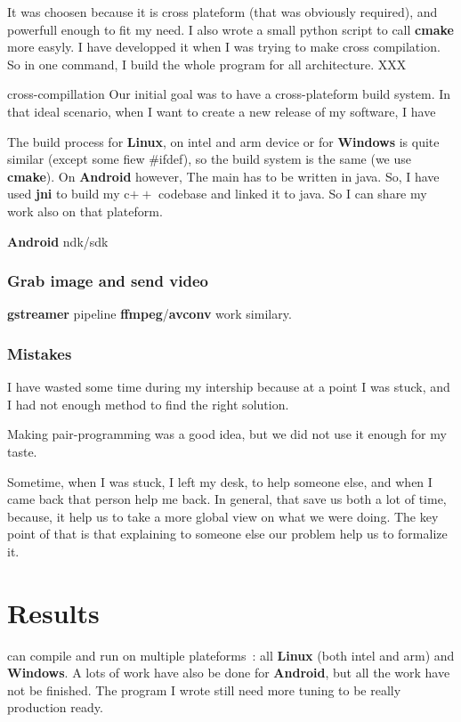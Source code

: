 \documentclass[a4paper,11pt]{custom}
\newcommand{\avconv}{\textbf{avconv}}
\newcommand{\ffmpeg}{\textbf{ffmpeg}}
\newcommand{\gstreamer}{\textbf{gstreamer}}
\newcommand{\cmake}{\textbf{cmake}}
\newcommand{\jni}{\textbf{jni}}
\newcommand{\linux}{\textbf{Linux}}
\newcommand{\win}{\textbf{Windows}}
\newcommand{\android}{\textbf{Android}}
\newcommand{\cpp}{c$++$}
\begin{document}
It was choosen because it is
cross plateform (that was obviously required), and powerfull enough to fit my
need. I also wrote a small python script to call \cmake{} more easyly. I have
developped it when I was trying to make cross compilation. So in one command, I
build the whole program for all architecture. XXX

cross-compillation
Our initial goal was to have a cross-plateform build system. In that ideal
scenario, when I want to create a new release of my software, I have

The build process for \linux, on intel and arm device or for \win{} is quite
similar (except some fiew \#ifdef), so the build system is the same (we use
\cmake). On \android{} however, The main has to be written in java. So, I have
used \jni{} to build my \cpp{} codebase and linked it to java. So I can share my
work also on that plateform.

\android{} ndk/sdk

\subsection{Grab image and send video}

\gstreamer{} pipeline
\ffmpeg/\avconv{} work similary.

\subsection{Mistakes}

I have wasted some time during my intership because at a point I was stuck, and
I had not enough method to find the right solution.

Making pair-programming was a good idea, but we did not use it enough for my
taste.

Sometime, when I was stuck, I left my desk, to help someone else, and when I
came back that person help me back. In general, that save us both a lot of time,
because, it help us to take a more global view on what we were doing. The key
point of that is that explaining to someone else our problem help us to
formalize it.

\chapter{Results}

can compile and run on multiple plateforms~: all \linux{} (both intel and arm) and
\win. A lots of work have also be done for \android, but all the work have
not be finished.
The program I wrote still need more tuning to be really production ready.
\end{document}
